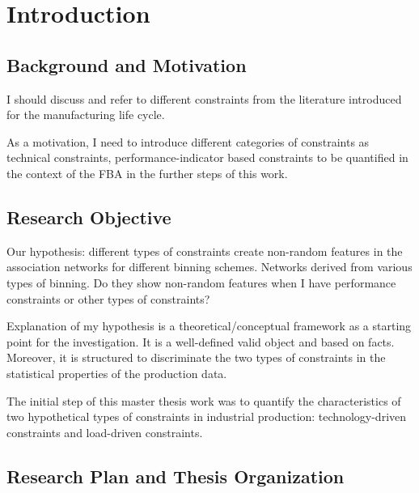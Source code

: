 \chapter{Introduction}

\section{Background and Motivation}
{\color{red} 
	I should discuss and refer to different constraints from the literature introduced for the manufacturing life cycle.
	
	As a motivation, I need to introduce different categories of constraints as technical constraints, performance-indicator based constraints to be quantified in the context of the FBA in the further steps of this work. 
}
\clearpage
\section{Research Objective}

{\color{red} 
	Our hypothesis: different types of constraints create non-random features in the association networks for different binning schemes. Networks derived from various types of binning. Do they show non-random features when I have performance constraints or other types of constraints?
	
	Explanation of my hypothesis is a theoretical/conceptual framework as a starting point for the investigation. It is a well-defined valid object and based on facts. Moreover, it is structured to discriminate the two types of constraints in the statistical properties of the production data.
	
	The initial step of this master thesis work was to quantify the characteristics of two hypothetical types of constraints in industrial production: technology-driven constraints and load-driven constraints. 
}

\section{Research Plan and Thesis Organization}

